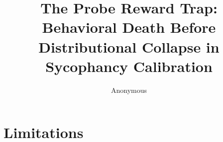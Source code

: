 \documentclass[11pt,a4paper]{article}
\title{The Probe Reward Trap: Behavioral Death Before Distributional Collapse in Sycophancy Calibration}
\author{Anonymous}
\begin{document}
\maketitle

\begin{abstract}

\end{abstract}

















\section*{Limitations}




\appendix

\end{document}
